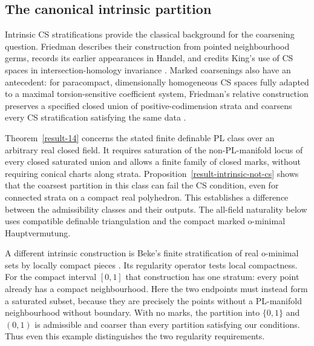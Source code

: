 \documentclass[11pt,a4paper]{article}
\theoremstyle{definition}
\begin{document}


\subsection{The canonical intrinsic partition}
Intrinsic CS stratifications provide the classical background for the
coarsening question.  Friedman describes their construction from pointed
neighbourhood germs, records its earlier appearances in Handel, and credits
King's use of CS spaces in intersection-homology invariance
\cite[p.~144]{FriedmanIntrinsic2022}.
Marked coarsenings also have an antecedent: for paracompact, dimensionally
homogeneous CS spaces fully adapted to a maximal torsion-sensitive
coefficient system, Friedman's relative
construction preserves a specified closed union of positive-codimension
strata and coarsens every CS stratification satisfying the same data
\cite[Definition~6.1 and Proposition~6.4, arXiv v3 pp.~43--46]
{Friedman2023Torsion}.

Theorem~\ref{result-14} concerns the stated finite definable PL class over
an arbitrary real closed field.  It requires saturation of the
non-PL-manifold locus of every closed saturated union and allows a finite
family of closed marks, without requiring conical charts along strata.
Proposition~\ref{result-intrinsic-not-cs} shows that the coarsest partition
in this class can fail the CS condition, even for connected strata on a
compact real polyhedron.  This establishes a difference between the
admissibility classes and their outputs.  The all-field naturality below
uses compatible definable triangulation and the compact marked
o-minimal Hauptvermutung.

A different intrinsic construction is Beke's finite stratification of
real o-minimal sets by locally compact pieces
\cite[Lemma~1.8 and Proposition~1.12, author manuscript pp.~4--6]
{Beke2011Tame}. Its regularity operator tests local compactness.
For the compact interval $[0,1]$ that construction has one stratum:
every point already has a compact neighbourhood. Here the two
endpoints must instead form a saturated subset, because they are
precisely the points without a PL-manifold neighbourhood without
boundary. With no marks, the partition into $\{0,1\}$ and $(0,1)$ is admissible
and coarser than every partition satisfying our conditions.
Thus even this example distinguishes the two regularity requirements.
\end{document}
